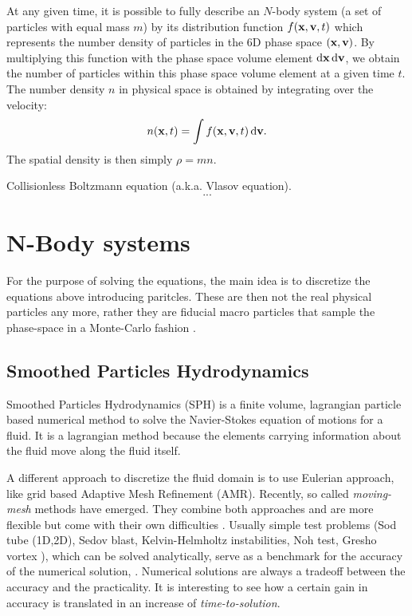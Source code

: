 At any given time, it is possible to fully describe an $N$-body system (a set of particles with equal mass $m$) by its distribution function $f(\boldsymbol{\mathbf{x}}, \boldsymbol{\mathbf{v}}, t)$ which represents the number density of particles in the 6D phase space $(\boldsymbol{\mathbf{x}}, \boldsymbol{\mathbf{v}})$. By multiplying this function with the phase space volume element $\operatorname{d}\!{\boldsymbol{\mathbf{x}}} \operatorname{d}\!{\boldsymbol{\mathbf{v}}}$, we obtain the number of particles within this phase space volume element at a given time $t$.
The number density $n$ in physical space is obtained by integrating over the velocity:
\begin{equation}
n(\boldsymbol{\mathbf{x}},t ) = \int f(\boldsymbol{\mathbf{x}}, \boldsymbol{\mathbf{v}}, t) \operatorname{d}\!{\boldsymbol{\mathbf{v}}}.
\end{equation}
The spatial density is then simply $\rho=mn$.

Collisionless Boltzmann equation (a.k.a. Vlasov equation).
\begin{equation}
...
\end{equation}

\section{N-Body systems}
For the purpose of solving the equations, the main idea is to discretize the equations above introducing paritcles. These are then not the real physical particles any more, rather they are fiducial macro particles that sample the phase-space in a Monte-Carlo fashion \citep{Springel2016}.


\subsection{Smoothed Particles Hydrodynamics}
Smoothed Particles Hydrodynamics (SPH) is a finite volume, lagrangian particle based numerical method to solve the Navier-Stokes equation of motions for a fluid.
It is a lagrangian method because the elements carrying information about the fluid move along the fluid itself.

A different approach to discretize the fluid domain is to use Eulerian approach, like grid based Adaptive Mesh Refinement (AMR).
Recently, so called \emph{moving-mesh} methods have emerged. They combine both approaches and are more flexible but come with their own difficulties \citep{Springel2010, Shadowfax, Arepo}.
Usually simple test problems (Sod tube (1D,2D), Sedov blast, Kelvin-Helmholtz instabilities, Noh test, Gresho vortex \citet{Gresho1990}), %
which can be solved analytically, serve as a benchmark for the accuracy of the numerical solution, \citep[e.g. by measuring the distance of the two solution with an L2-norm in the whole domain, ][]{BorrowSphenix}.
Numerical solutions are always a tradeoff between the accuracy and the practicality.
It is interesting to see how a certain gain in accuracy is translated in an increase of \emph{time-to-solution}.

